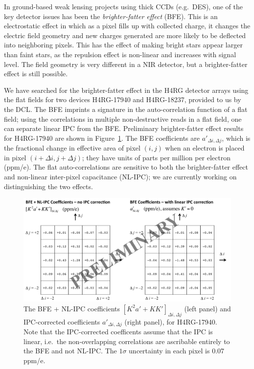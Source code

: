 In ground-based weak lensing projects using thick CCDs (e.g.\ DES), one of the key detector issues has been the {\em brighter-fatter effect} (BFE). This is an electrostatic effect in which as a pixel fills up with collected charge, it changes the electric field geometry and new charges generated are more likely to be deflected into neighboring pixels. This has the effect of making bright stars appear larger than faint stars, as the repulsion effect is non-linear and increases with signal level. The field geometry is very different in a NIR detector, but a brighter-fatter effect is still possible.

We have searched for the brighter-fatter effect in the H4RG detector arrays using the flat fields for two devices H4RG-17940 and H4RG-18237, provided to us by the DCL. The BFE imprints a signature in the auto-correlation function of a flat field; using the correlations in multiple non-destructive reads in a flat field, one can separate linear IPC from the BFE. Preliminary brighter-fatter effect results for H4RG-17940 are shown in Figure~\ref{fig:kernel}. The BFE coefficients are $a'_{\Delta i,\Delta j}$, which is the fractional change in effective area of pixel $(i,j)$ when an electron is placed in pixel $(i+\Delta i, j+\Delta j)$; they have units of parts per million per electron (ppm/e). The flat auto-correlations are sensitive to both the brighter-fatter effect and non-linear inter-pixel capacitance (NL-IPC); we are currently working on distinguishing the two effects.

\begin{figure}
\includegraphics[width=6.2in]{Plots/kernel-17940B.pdf}
\caption{\label{fig:kernel}The BFE + NL-IPC coefficients $[K^2a'+KK']_{\Delta i,\Delta j}$ (left panel) and IPC-corrected coefficients $a'_{\Delta i,\Delta j}$ (right panel), for H4RG-17940. Note that the IPC-corrected coefficents assume that the IPC is linear, i.e.\ the non-overlapping correlations are ascribable entirely to the BFE and not NL-IPC. The $1\sigma$ uncertainty in each pixel is 0.07 ppm/e.}
\end{figure}

